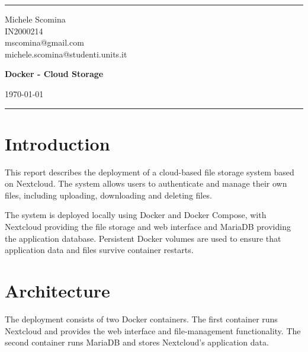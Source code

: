 \documentclass[a4paper]{article}
\begin{document}

\fancyhead[C]{}
\hrule \medskip %
\begin{minipage}{0.295\textwidth} 
  \raggedright
  \scriptsize %
  Michele Scomina \hfill\\   
  IN2000214\hfill\\
  mscomina@gmail.com\hfill\\
  michele.scomina@studenti.units.it
\end{minipage}
\begin{minipage}{0.4\textwidth} 
\centering 
\large 
\textbf{Docker - Cloud Storage}\\ 
\end{minipage}
\begin{minipage}{0.295\textwidth} 
\raggedleft
\today\hfill\\
\end{minipage}
\medskip\hrule 
\bigskip

\setlength{\parskip}{4pt}

\begin{abstract}
This is the report for Exercise 3. In this report we showcase a deployment procedure for a Cloud system,
as described in the \href{https://github.com/Foundations-of-HPC/Cloud-Basic-2023/blob/main/Assignments/Exercise.md}{GitHub repository}.
\end{abstract}

\section{Introduction}

This report describes the deployment of a cloud-based file storage
system based on Nextcloud. The system allows users to authenticate
and manage their own files, including uploading, downloading and
deleting files.

The system is deployed locally using Docker and Docker Compose, with
Nextcloud providing the file storage and web interface and MariaDB
providing the application database. Persistent Docker volumes are used
to ensure that application data and files survive container restarts.

\section{Architecture}

The deployment consists of two Docker containers. The first container
runs Nextcloud and provides the web interface and file-management
functionality. The second container runs MariaDB and stores Nextcloud's
application data.
\end{document}
